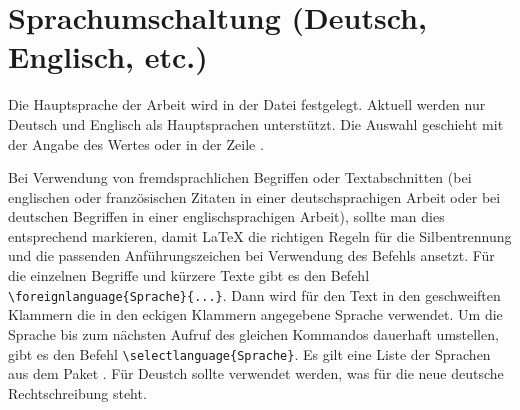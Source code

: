\section{Sprachumschaltung (Deutsch, Englisch, etc.)}%
%
%
%
\label{sec:Sprache}
%
Die Hauptsprache der Arbeit wird in der Datei  festgelegt.
Aktuell werden nur Deutsch und Englisch als Hauptsprachen unterstützt.
Die Auswahl geschieht mit der Angabe des Wertes  oder 
in der Zeile .

Bei Verwendung von fremdsprachlichen Begriffen oder Textabschnitten
(\zB bei englischen oder französischen Zitaten in einer deutschsprachigen Arbeit
oder bei deutschen Begriffen in einer englischsprachigen Arbeit),
sollte man dies entsprechend markieren,
damit \LaTeX{} die richtigen Regeln für die Silbentrennung
und die passenden Anführungszeichen bei Verwendung des Befehls
 ansetzt.
Für die einzelnen Begriffe und kürzere Texte gibt es den Befehl
\verb+\foreignlanguage{Sprache}{...}+.
Dann wird für den Text in den geschweiften Klammern die in den eckigen Klammern angegebene Sprache verwendet.
Um die Sprache bis zum nächsten Aufruf des gleichen Kommandos dauerhaft umstellen,
gibt es den Befehl \verb+\selectlanguage{Sprache}+.
Es gilt eine Liste der Sprachen aus dem Paket .
Für Deustch sollte  verwendet werden, was für die
neue deutsche Rechtschreibung steht.